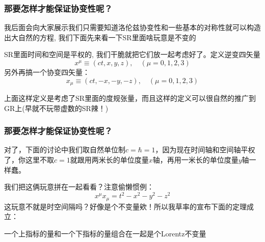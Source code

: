\documentclass{whu-beamer}
\begin{document}
\begin{frame}
  \frametitle{那要怎样才能保证协变性呢？}
  我后面会向大家展示我们只需要知道洛伦兹协变性和一些基本的对称性就可以构造出大自然的方程, 我们下面先来看一下SR里面啥玩意是\alert{不变的}
  \pause

  \begin{definition}
    SR里面时间和空间是平权的, 我们干脆就把它们放一起考虑好了。定义逆变四矢量
    \[x^\mu\equiv(ct,x,y,z),\quad(\mu=0,1,2,3)\]
    另外再搞一个协变四矢量：
    \[x_\mu\equiv(ct,-x,-y,-z),\quad(\mu=0,1,2,3)\]
  \end{definition}
  \pause
  上面这样定义是考虑了SR里面的度规张量，而且这样的定义可以很自然的推广到GR上(早就不玩带虚数的SR辣！)
\end{frame}

\begin{frame}
  \frametitle{那要怎样才能保证协变性呢？}
  对了，下面的讨论中我们取自然单位制$c=\hbar=1$，因为现在时间轴和空间轴平权了，你这里不取$c=1$就跟用两米长的单位度量$x$轴，再用一米长的单位度量$y$轴一样蠢。
  
  \setlength{\parindent}{2em}我们把这俩玩意拼在一起看看？注意偷懒惯例：
  \pause
  \begin{equation}
    x^\mu x_\mu=t^2-x^2-y^2-z^2
  \end{equation}
  这玩意不就是时空间隔吗？好像是个不变量欸！所以我草率的宣布下面的定理成立：
  \begin{claim}[沃·兹基·硕德定理]
    一个上指标的量和一个下指标的量组合在一起是个Lorentz不变量
  \end{claim}
\end{frame}
\end{document}
